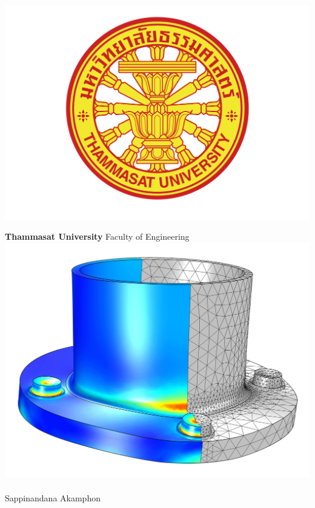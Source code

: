 \documentclass[
10pt,
a4paper,
openany,
svgnames,
]{book}
\begin{document}
\frontmatter

\begin{titlepage}
  \pagecolor{titlepagecolor}
  \includegraphics[scale=0.2]{pictures/logo-tu} \\
  \noindent
  \color{white}
  \makebox[0pt][l]{\rule{1.3\textwidth}{1pt}}
  \par
  \noindent
  \textbf{\textsf{Thammasat University}} \textcolor{namecolor}{\textsf{Faculty of Engineering}}
  \vfill
  \hspace{1cm}
  \includegraphics[scale=0.23]{pictures/tube-connection}
  \vfill
  \noindent
   \\
  \vspace{1cm}
   \\
  \vspace{1cm}
  \noindent
  {\Large {Sappinandana Akamphon}}
\end{titlepage}
\end{document}
